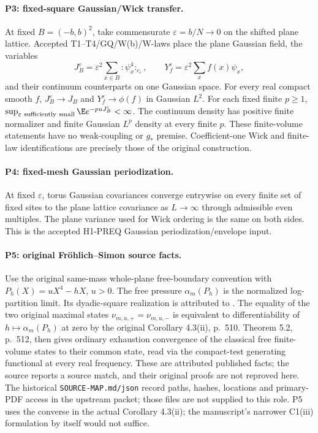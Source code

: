 \paragraph{P3: fixed-square Gaussian/Wick transfer.}
At fixed $B=(-b,b)^2$, take commensurate $\varepsilon=b/N\to0$ on the
shifted plane lattice. Accepted T1--T4/GQ/W(b)/W-laws place the plane
Gaussian field, the variables
\[
 J_B^\varepsilon=\varepsilon^2\sum_{x\in B}{:}\psi_x^4{:}_{c_\varepsilon},
 \qquad Y_f^\varepsilon=\varepsilon^2\sum_x f(x)\psi_x,
\]
and their continuum counterparts on one Gaussian space.
For every real compact smooth $f$, $J_B^\varepsilon\to J_B$ and
$Y_f^\varepsilon\to\phi(f)$ in Gaussian $L^2$.
For each fixed finite $p\ge1$,
$\sup_{\varepsilon\ \mathrm{sufficiently\ small}}\E e^{-puJ_B^\varepsilon}<\infty$.
The continuum density has positive finite normalizer and finite Gaussian
$L^p$ density at every finite $p$. These finite-volume statements have no
weak-coupling or $g_*$ premise. Coefficient-one Wick and finite-law
identifications are precisely those of the original construction.

\paragraph{P4: fixed-mesh Gaussian periodization.}
At fixed $\varepsilon$, torus Gaussian covariances converge entrywise on
every finite set of fixed sites to the plane lattice covariance as
$L\to\infty$ through admissible even multiples. The plane variance used
for Wick ordering is the same on both sides. This is the accepted H1-PREQ
Gaussian periodization/envelope input.

\paragraph{P5: original Fr\"ohlich--Simon source facts.}
Use the original same-mass whole-plane free-boundary convention with
$P_h(X)=uX^4-hX$, $u>0$. The free pressure $\alpha_m(P_h)$ is the
normalized log-partition limit. Its dyadic-square realization is attributed
to \citet[Proposition 2.1 and the remark after (2.3), pp.~502--503]{FS1977}.
The equality of the two original maximal states
$\nu_{m,u,+}=\nu_{m,u,-}$ is equivalent to differentiability of
$h\mapsto\alpha_m(P_h)$ at zero by the original Corollary 4.3(ii), p.~510.
Theorem 5.2, p.~512, then gives ordinary exhaustion convergence of the
classical free finite-volume states to their common state, read via the
compact-test generating functional at every real frequency.
These are attributed published facts; the source reports a source match,
and their original proofs are not reproved here. The historical
\texttt{SOURCE-MAP.md/json} record paths, hashes, locations and primary-PDF
access in the upstream packet; those files are not supplied to this role.
P5 uses the converse in the actual Corollary 4.3(ii); the manuscript's
narrower C1(iii) formulation by itself would not suffice.

